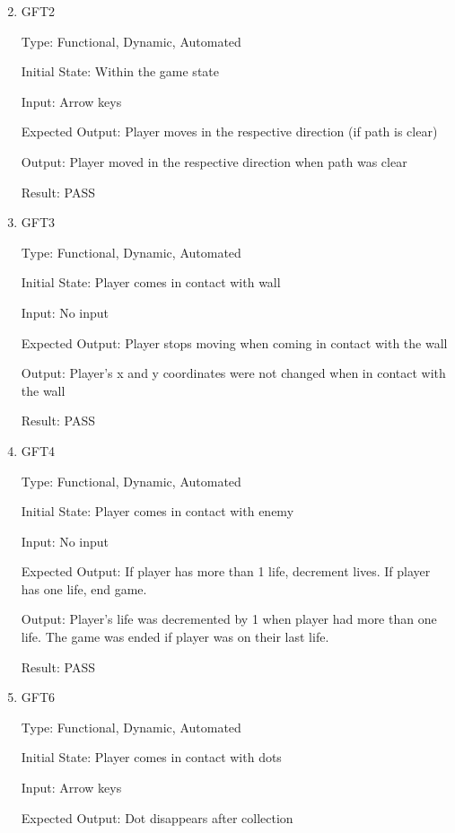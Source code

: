 \documentclass[12pt, titlepage]{article}
\begin{document}
\begin{enumerate}
\setcounter{enumi}{1}
\item{\label{gft2}{GFT2}\\}

Type: Functional, Dynamic, Automated
					
Initial State: Within the game state
					
Input: Arrow keys
					
Expected Output: Player moves in the respective direction (if path is clear)

Output: Player moved in the respective direction when path was clear
					
Result: PASS

\item{\label{gft3}{GFT3}\\}

Type: Functional, Dynamic, Automated
					
Initial State: Player comes in contact with wall
					
Input: No input
					
Expected Output: Player stops moving when coming in contact with the wall

Output: Player's x and y coordinates were not changed when in contact with the wall

Result: PASS

\item{\label{gft4}{GFT4}\\}

Type: Functional, Dynamic, Automated
					
Initial State: Player comes in contact with enemy
					
Input: No input
					
Expected Output: If player has more than 1 life, decrement lives. If player has one life, end game.

Output: Player's life was decremented by 1 when player had more than one life. The game was ended if player was on their last life.

Result: PASS
\setcounter{enumi}{5}
\item{\label{gft6}{GFT6}\\}

Type: Functional, Dynamic, Automated
					
Initial State: Player comes in contact with dots
					
Input: Arrow keys
					
Expected Output: Dot disappears after collection


\end{enumerate}
\end{document}

